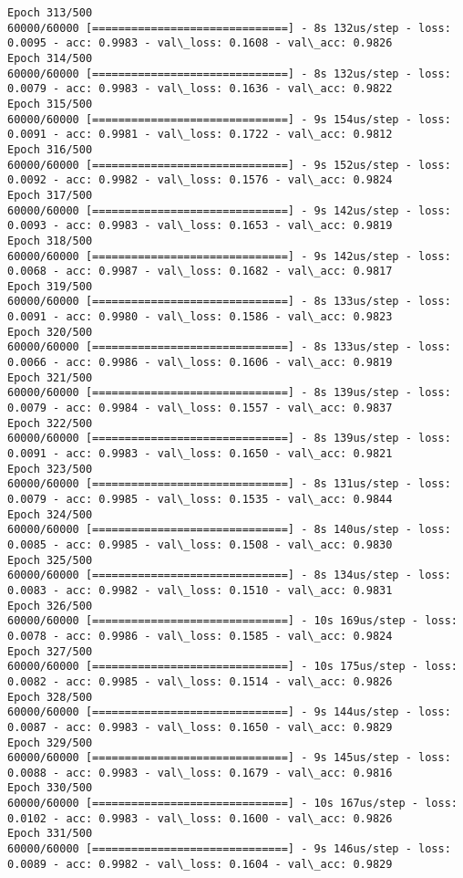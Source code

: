 \documentclass[11pt]{article}
\begin{document}
\begin{Verbatim}[commandchars=\\\{\}]
Epoch 313/500
60000/60000 [==============================] - 8s 132us/step - loss: 0.0095 - acc: 0.9983 - val\_loss: 0.1608 - val\_acc: 0.9826
Epoch 314/500
60000/60000 [==============================] - 8s 132us/step - loss: 0.0079 - acc: 0.9983 - val\_loss: 0.1636 - val\_acc: 0.9822
Epoch 315/500
60000/60000 [==============================] - 9s 154us/step - loss: 0.0091 - acc: 0.9981 - val\_loss: 0.1722 - val\_acc: 0.9812
Epoch 316/500
60000/60000 [==============================] - 9s 152us/step - loss: 0.0092 - acc: 0.9982 - val\_loss: 0.1576 - val\_acc: 0.9824
Epoch 317/500
60000/60000 [==============================] - 9s 142us/step - loss: 0.0093 - acc: 0.9983 - val\_loss: 0.1653 - val\_acc: 0.9819
Epoch 318/500
60000/60000 [==============================] - 9s 142us/step - loss: 0.0068 - acc: 0.9987 - val\_loss: 0.1682 - val\_acc: 0.9817
Epoch 319/500
60000/60000 [==============================] - 8s 133us/step - loss: 0.0091 - acc: 0.9980 - val\_loss: 0.1586 - val\_acc: 0.9823
Epoch 320/500
60000/60000 [==============================] - 8s 133us/step - loss: 0.0066 - acc: 0.9986 - val\_loss: 0.1606 - val\_acc: 0.9819
Epoch 321/500
60000/60000 [==============================] - 8s 139us/step - loss: 0.0079 - acc: 0.9984 - val\_loss: 0.1557 - val\_acc: 0.9837
Epoch 322/500
60000/60000 [==============================] - 8s 139us/step - loss: 0.0091 - acc: 0.9983 - val\_loss: 0.1650 - val\_acc: 0.9821
Epoch 323/500
60000/60000 [==============================] - 8s 131us/step - loss: 0.0079 - acc: 0.9985 - val\_loss: 0.1535 - val\_acc: 0.9844
Epoch 324/500
60000/60000 [==============================] - 8s 140us/step - loss: 0.0085 - acc: 0.9985 - val\_loss: 0.1508 - val\_acc: 0.9830
Epoch 325/500
60000/60000 [==============================] - 8s 134us/step - loss: 0.0083 - acc: 0.9982 - val\_loss: 0.1510 - val\_acc: 0.9831
Epoch 326/500
60000/60000 [==============================] - 10s 169us/step - loss: 0.0078 - acc: 0.9986 - val\_loss: 0.1585 - val\_acc: 0.9824
Epoch 327/500
60000/60000 [==============================] - 10s 175us/step - loss: 0.0082 - acc: 0.9985 - val\_loss: 0.1514 - val\_acc: 0.9826
Epoch 328/500
60000/60000 [==============================] - 9s 144us/step - loss: 0.0087 - acc: 0.9983 - val\_loss: 0.1650 - val\_acc: 0.9829
Epoch 329/500
60000/60000 [==============================] - 9s 145us/step - loss: 0.0088 - acc: 0.9983 - val\_loss: 0.1679 - val\_acc: 0.9816
Epoch 330/500
60000/60000 [==============================] - 10s 167us/step - loss: 0.0102 - acc: 0.9983 - val\_loss: 0.1600 - val\_acc: 0.9826
Epoch 331/500
60000/60000 [==============================] - 9s 146us/step - loss: 0.0089 - acc: 0.9982 - val\_loss: 0.1604 - val\_acc: 0.9829

\end{Verbatim}
\end{document}
